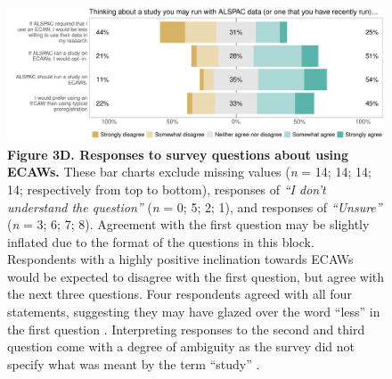 \documentclass[
  man,floatsintext]{apa6}
\begin{document}
\begin{figure}[H]

{\centering \includegraphics[width=1\linewidth]{figs/alspacPlotAll-1} 

}

\caption{\textbf{Figure 3D. Responses to survey questions about using ECAWs.} These bar charts exclude missing values (\emph{n} = 14; 14; 14; 14; respectively from top to bottom), responses of \emph{``I don't understand the question''} (\emph{n} = 0; 5; 2; 1), and responses of \emph{``Unsure''} (\emph{n} = 3; 6; 7; 8). Agreement with the first question may be slightly inflated due to the format of the questions in this block. Respondents with a highly positive inclination towards ECAWs would be expected to disagree with the first question, but agree with the next three questions. Four respondents agreed with all four statements, suggesting they may have glazed over the word ``less'' in the first question \protect\footnotemark[2]. Interpreting responses to the second and third question come with a degree of ambiguity as the survey did not specify what was meant by the term ``study'' \protect\footnotemark[3].}\label{fig:alspacPlotAll}
\end{figure}

{\smaller[1]
\begin{singlespace}



\end{singlespace}
}

\protect{}
\protect{}
\end{document}

